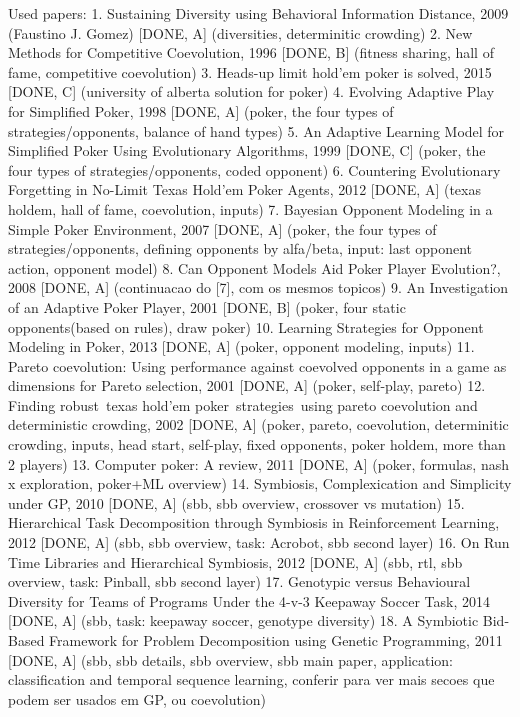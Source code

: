 Used papers:
1. Sustaining Diversity using Behavioral Information Distance, 2009 (Faustino J. Gomez) [DONE, A] (diversities, determinitic crowding)
2. New Methods for Competitive Coevolution, 1996 [DONE, B] (fitness sharing, hall of fame, competitive coevolution)
3. Heads-up limit hold’em poker is solved, 2015 [DONE, C] (university of alberta solution for poker)
4. Evolving Adaptive Play for Simplified Poker, 1998 [DONE, A] (poker, the four types of strategies/opponents, balance of hand types)
5. An Adaptive Learning Model for Simplified Poker Using Evolutionary Algorithms, 1999 [DONE, C] (poker, the four types of strategies/opponents, coded opponent)
6. Countering Evolutionary Forgetting in No-Limit Texas Hold’em Poker Agents, 2012 [DONE, A] (texas holdem, hall of fame, coevolution, inputs)
7. Bayesian Opponent Modeling in a Simple Poker Environment, 2007 [DONE, A] (poker, the four types of strategies/opponents, defining opponents by alfa/beta, input: last opponent action, opponent model)
8. Can Opponent Models Aid Poker Player Evolution?, 2008 [DONE, A] (continuacao do [7], com os mesmos topicos)
9. An Investigation of an Adaptive Poker Player, 2001 [DONE, B] (poker, four static opponents(based on rules), draw poker)
10. Learning Strategies for Opponent Modeling in Poker, 2013 [DONE, A] (poker, opponent modeling, inputs)
11. Pareto coevolution: Using performance against coevolved opponents in a game as dimensions for Pareto selection, 2001 [DONE, A] (poker, self-play, pareto)
12. Finding robust texas hold'em poker strategies using pareto coevolution and deterministic crowding, 2002 [DONE, A] (poker, pareto, coevolution, determinitic crowding, inputs, head start, self-play, fixed opponents, poker holdem, more than 2 players)
13. Computer poker: A review, 2011 [DONE, A] (poker, formulas, nash x exploration, poker+ML overview)
14. Symbiosis, Complexication and Simplicity under GP, 2010 [DONE, A] (sbb, sbb overview, crossover vs mutation)
15. Hierarchical Task Decomposition through Symbiosis in Reinforcement Learning, 2012 [DONE, A] (sbb, sbb overview, task: Acrobot, sbb second layer)
16. On Run Time Libraries and Hierarchical Symbiosis, 2012 [DONE, A] (sbb, rtl, sbb overview, task: Pinball, sbb second layer)
17. Genotypic versus Behavioural Diversity for Teams of Programs Under the 4-v-3 Keepaway Soccer Task, 2014 [DONE, A] (sbb, task: keepaway soccer, genotype diversity)
18. A Symbiotic Bid-Based Framework for Problem Decomposition using Genetic Programming, 2011 [DONE, A] (sbb, sbb details, sbb overview, sbb main paper, application: classification and temporal sequence learning, conferir para ver mais secoes que podem ser usados em GP, ou coevolution)


